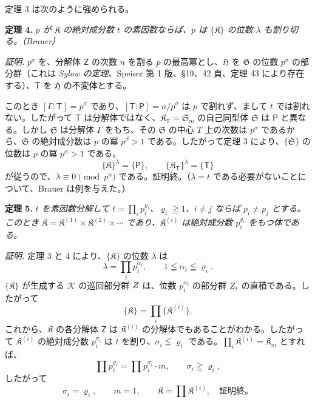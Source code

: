 定理 3 は次のように強められる。

\textbf{定理 4.} \emph{\(p\) が \(\mathfrak K\) の絶対成分数 \(t\) の素因数ならば、\(p\) は \(\{\mathfrak K\}\) の位数 \(\lambda\) も割り切る。（Brauer）}

\emph{証明.} \(p^\sigma\) を、分解体 \(\mathsf{Z}\) の次数 \(n\) を割る \(p\) の最高冪とし、\(\mathfrak H\) を \(\mathfrak G\) の位数 \(p^\sigma\) の部分群（これは \emph{Sylow の定理}、Speiser 第 1 版、\S 19、42 頁、定理 43 により存在する）、\(\mathsf{T}\) を \(\mathfrak H\) の不変体とする。

このとき \([\Gamma:\mathsf{T}]=p^\sigma\) であり、\([\mathsf{T}:\mathsf P]=n/p^\sigma\) は \(p\) で割れず、まして \(t\) では割れない。したがって \(\mathsf{T}\) は分解体ではなく、\(\mathfrak K_{\mathsf{T}}=\mathfrak S_m\) の自己同型体 \(\mathfrak S\) は \(\mathsf P\) と異なる。しかし \(\mathfrak S\) は分解体 \(\Gamma\) をもち、その \(\mathfrak S\) の中心 \(T\) 上の次数は \(p^\sigma\) であるから、\(\mathfrak S\) の絶対成分数は \(p\) の冪 \(p^\beta>1\) である。したがって定理 3 により、\(\{\mathfrak S\}\) の位数は \(p\) の冪 \(p^\alpha>1\) である。
\[
\{\mathfrak K\}^{\lambda}=\{\mathsf P\},
\qquad
\{\mathfrak K_{\mathsf{T}}\}^{\lambda}=\{\mathsf{T}\}
\]
が従うので、\(\lambda\equiv0\pmod {p^\alpha}\) である。証明終。（\(\lambda=t\) である必要がないことについて、Brauer は例を与えた。）

\textbf{定理 5.} \emph{\(t\) を素因数分解して \(t=\prod_i p_i^{\varrho_i}\)、\(\varrho_i\geqq1\)、\(i\ne j\) ならば \(p_i\ne p_j\) とする。このとき \(\mathfrak K=\mathfrak K^{(1)}\times\mathfrak K^{(2)}\times\cdots\) であり、\(\mathfrak K^{(i)}\) は絶対成分数 \(p_i^{\varrho_i}\) をもつ体である。}

\emph{証明.} 定理 3 と 4 により、\(\{\mathfrak K\}\) の位数 \(\lambda\) は
\[
\lambda=\prod_i p_i^{\alpha_i},\qquad 1\leqq\alpha_i\leqq\varrho_i.
\]
\(\{\mathfrak K\}\) が生成する \(\mathscr K\) の巡回部分群 \(\mathscr \mathsf{Z}\) は、位数 \(p_i^{\alpha_i}\) の部分群 \(\mathscr \mathsf{Z}_i\) の直積である。したがって
\[
\{\mathfrak K\}=\prod_i\{\mathfrak K^{(i)}\}.
\]
これから、\(\mathfrak K\) の各分解体 \(\mathsf{Z}\) は \(\mathfrak K^{(i)}\) の分解体でもあることがわかる。したがって \(\mathfrak K^{(i)}\) の絶対成分数 \(p_i^{\sigma_i}\) は \(t\) を割り、\(\sigma_i\leqq\varrho_i\) である。\(\prod_i\mathfrak K^{(i)}=\mathfrak K_m\) とすれば、
\[
\prod p_i^{\varrho_i}=\prod p_i^{\sigma_i}\cdot m,
\qquad
\sigma_i\geqq\varrho_i,
\]
したがって
\[
\sigma_i=\varrho_i,\qquad m=1,\qquad
\mathfrak K=\prod \mathfrak K^{(i)},
\quad\text{証明終。}
\]

